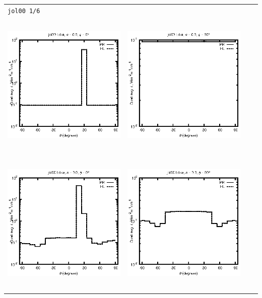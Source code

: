 
\pagebreak

\begin{tabular}{c c c c}
\multicolumn{4}{l}{\texttt{jol00 1/6}} \\
\includegraphics[height=7cm]{../eps/jol00_Ld_a_fwd.eps} &
\includegraphics[height=7cm]{../eps/jol00_Ld_a_cross.eps}\\
\includegraphics[height=7cm]{../eps/jol00_Ld_w_fwd.eps} &
\includegraphics[height=7cm]{../eps/jol00_Ld_w_cross.eps} \\

\end{tabular}

